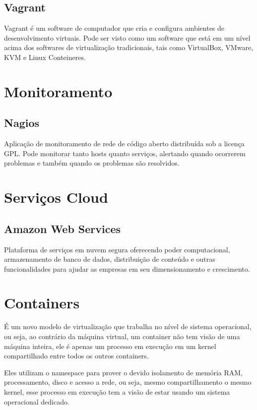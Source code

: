 	\subsection{Vagrant} Vagrant é um software de computador que cria e 
	configura ambientes de desenvolvimento virtuais. Pode ser visto como 
	um software que está em um nível acima dos softwares de virtualização 
	tradicionais, tais como VirtualBox, VMware, KVM e Linux Conteineres.

    \section{Monitoramento}

	\subsection{Nagios} Aplicação de monitoramento de rede de código 
	aberto distribuída sob a licença GPL. Pode monitorar tanto hosts 
	quanto serviços, alertando quando ocorrerem problemas e também 
	quando os problemas são resolvidos.

    \section{Serviços Cloud}

	\subsection{Amazon Web Services} Plataforma de serviços em nuvem 
	segura oferecendo poder computacional, armazenamento de banco de 
	dados, distribuição de conteúdo e outras funcionalidades para 
	ajudar as empresas em seu dimensionamento e crescimento.
	
\section{Containers}
É um novo modelo de virtualização que trabalha no nível de sistema operacional, 
ou seja, ao contrário da máquina virtual, um container não tem visão de uma 
máquina inteira, ele é apenas um processo em execução em um kernel compartilhado 
entre todos os outros containers.

Eles utilizam o namespace para prover o devido isolamento de memória RAM, 
processamento, disco e acesso a rede, ou seja, mesmo compartilhamento o 
mesmo kernel, esse processo em execução tem a visão de estar usando um 
sistema operacional dedicado.

